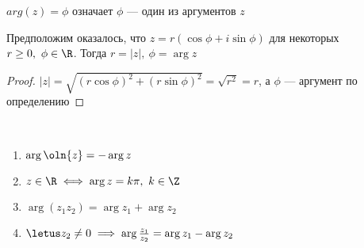 \begin{defn}
    $arg(z) = \phi$ означает $\phi$ --- один из аргументов $z$
\end{defn}

\begin{notice}
    Предположим оказалось, что $z = r(\cos\phi + i\sin\phi)$ для некоторых $r \geq 0,~\phi \in \R$.
    Тогда $r = |z|,~\phi = \arg z$
\end{notice}

\begin{proof}
    $|z| = \sqrt{(r\cos\phi)^2 + (r\sin\phi)^2} = \sqrt{r^2} = r$, а $\phi$ --- аргумент по определению
\end{proof}

\begin{theorem-non}~
    \begin{enumerate}
        \item $\arg \oln{z} = -\arg z$
        \item $z \in \R \iff \arg z = k \pi,~k \in \Z$
        \item $\arg(z_1 z_2) = \arg z_1 + \arg z_2$
        \item $\letus z_2 \neq 0 \implies \arg \frac{z_1}{z_2} = \arg z_1 - \arg z_2$
    \end{enumerate}
\end{theorem-non}

